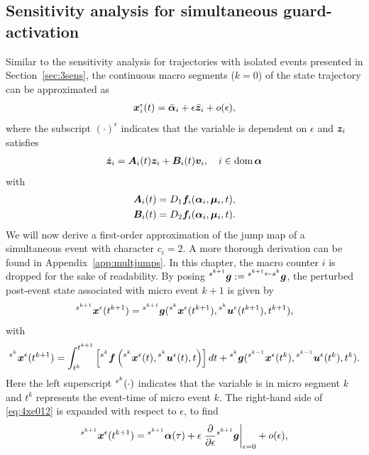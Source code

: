 \documentclass[../DC2017114Bouma.tex]{subfiles}
\begin{document}
\subsection{Sensitivity analysis for simultaneous guard-activation}
Similar to the sensitivity analysis for trajectories with isolated events presented in Section~\ref{sec:3sens}, the continuous macro segments ($k=0$) of the state trajectory can be approximated as
\begin{align}
{\boldsymbol{x}}_i^\epsilon(t) = \bar{\boldsymbol{\alpha}}_i + \epsilon\bar{{\boldsymbol{z}}}_i + o(\epsilon),
\end{align}
where the subscript $(\cdot)^\epsilon$ indicates that the variable is dependent on $\epsilon$ and ${\boldsymbol{z}}_i$ satisfies
\begin{align}
\dot{{\boldsymbol{z}}}_i = {\boldsymbol{A}}_i(t){\boldsymbol{z}}_i +{\boldsymbol{B}}_i(t){\boldsymbol{v}}_i,\quad i\in \operatorname{\textnormal{dom}}\boldsymbol{\alpha}
\end{align}
with
\begin{align*}
{\boldsymbol{A}}_i(t) &= D_1{\boldsymbol{f}}_i(\boldsymbol{\alpha}_i,\boldsymbol{\mu}_i,t),\\
{\boldsymbol{B}}_i(t) &= D_2{\boldsymbol{f}}_i(\boldsymbol{\alpha}_i,\boldsymbol{\mu}_i,t).
\end{align*}
We will now derive a first-order approximation of the jump map of a simultaneous event with character $c_i = 2$. A more thorough derivation can be found in Appendix~\ref{app:multjumps}. In this chapter, the macro counter $i$ is dropped for the sake of readability. By posing $\hspace{0cm}^{s^{k+1}}{\boldsymbol{g}} := \hspace{0cm}^{s^{k+1}\leftarrow s^k}{\boldsymbol{g}}$, the perturbed post-event state associated with micro event $k+1$ is given by
\begin{align}
\hspace{0cm}^{s^{k+1}}{\boldsymbol{x}}^\epsilon(t^{k+1}) = \hspace{0cm}^{s^{k+1}}{\boldsymbol{g}}(\hspace{0cm}^{s^{k}}{\boldsymbol{x}}^\epsilon(t^{k+1}),\hspace{0cm}^{s^{k}}{\boldsymbol{u}}^\epsilon(t^{k+1}),t^{k+1}),\label{eq:4xe012}
\end{align}
with
\begin{align}
\hspace{0cm}^{s^{k}}{\boldsymbol{x}}^\epsilon(t^{k+1}) = \int_{t^{k}}^{t^{k+1}}\left[\hspace{0cm}^{s^{k}}{\boldsymbol{f}}\left(\hspace{0cm}^{s^{k}}{\boldsymbol{x}}^\epsilon(t),\hspace{0cm}^{s^{k}}{\boldsymbol{u}}^\epsilon(t),t\right)\right]dt + \hspace{0cm}^{s^{k}}{\boldsymbol{g}}(\hspace{0cm}^{s^{k-1}}{\boldsymbol{x}}^\epsilon(t^{k}),\hspace{0cm}^{s^{k-1}}{\boldsymbol{u}}^\epsilon(t^{k}),t^{k}).\label{eq:4xe01}
\end{align}
Here the left superscript $\hspace{0cm}^{s^k}(\cdot)$ indicates that the variable is in micro segment $k$ and $t^k$ represents the event-time of micro event $k$. The right-hand side of \eqref{eq:4xe012} is expanded with respect to $\epsilon$, to find
\begin{align}
\hspace{0cm}^{s^{k+1}}{\boldsymbol{x}}^\epsilon(t^{k+1}) = \hspace{0cm}^{s^{k+1}}\boldsymbol{\alpha}(\tau) + \epsilon\left.\frac{\partial}{\partial\epsilon}\hspace{0cm}^{s^{k+1}}{\boldsymbol{g}}\right|_{\epsilon=0} + o(\epsilon),\label{eq:4xe012exp}
\end{align}
\end{document}
